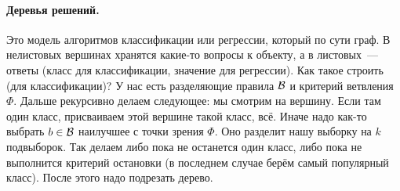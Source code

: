 \documentclass{article}
\begin{document}
    \paragraph{Деревья решений.}
    Это модель алгоритмов классификации или регрессии, который по сути граф. В нелистовых вершинах хранятся какие-то вопросы к объекту, а в листовых~--- ответы (класс для классификации, значение для регрессии). Как такое строить (для классификации)? У нас есть разделяющие правила ${\mathcal{B}}$ и критерий ветвления $\Phi$. Дальше рекурсивно делаем следующее: мы смотрим на вершину. Если там один класс, присваиваем этой вершине такой класс, всё. Иначе надо как-то выбрать $b\in{\mathcal{B}}$ наилучшее с точки зрения $\Phi$. Оно разделит нашу выборку на $k$ подвыборок. Так делаем либо пока не останется один класс, либо пока не выполнится критерий остановки (в последнем случае берём самый популярный класс). После этого надо подрезать дерево.
\end{document}
